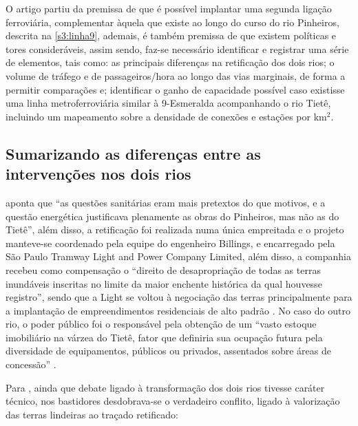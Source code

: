 \documentclass[
article,			%
11pt,				%
oneside,			%
a4paper,			%
english,			%
brazil,				%
sumario=tradicional
]{abntex2}
\begin{document}
	O artigo partiu da premissa de que é possível implantar uma segunda ligação ferroviária, complementar àquela que existe ao longo do curso do rio Pinheiros, descrita na \autoref{s3:linha9}, ademais, é também premissa de que existem políticas e tores consideráveis, assim sendo, faz-se necessário identificar e registrar uma série de elementos, tais como: as principais diferenças na retificação dos dois rios; o volume de tráfego e de passageiros/hora ao longo das vias marginais, de forma a permitir comparações e; identificar o ganho de capacidade possível caso existisse uma linha metroferroviária similar à 9-Esmeralda acompanhando o rio Tietê, incluindo um mapeamento sobre a densidade de conexões e estações por km$^{2}$.
	
	\subsection{Sumarizando as diferenças entre as intervenções nos dois rios} \label{s2:sumarizando}
	
	 aponta que ``as questões sanitárias eram mais pretextos do que motivos, e a questão energética justificava plenamente as obras do Pinheiros, mas não as do Tietê'', além disso, a retificação foi realizada numa única empreitada e o projeto manteve-se coordenado pela equipe do engenheiro Billings, \cite[p. 58]{franco2005a} e encarregado pela São Paulo Tramway Light and Power Company Limited, além disso, a companhia recebeu como compensação o ``direito de desapropriação de todas as terras inundáveis inscritas no limite da maior enchente histórica da qual houvesse registro''\cite[p. 59]{franco2005a}, sendo que a Light se voltou à negociação das terras principalmente para a implantação de empreendimentos residenciais de alto padrão \cite[p. 55]{franco2005a}. No caso do outro rio, o poder público foi o responsável pela obtenção de um ``vasto estoque imobiliário na várzea do Tietê, fator que definiria sua ocupação futura pela diversidade de equipamentos, públicos ou privados, assentados sobre áreas de concessão'' \cite[p. 55]{franco2005a}.
	
	Para \cite[p. 55]{franco2005a}, ainda que debate ligado à transformação dos dois rios tivesse caráter técnico, nos bastidores desdobrava-se o verdadeiro conflito, ligado à valorização das terras lindeiras ao traçado retificado:
	
\end{document}
